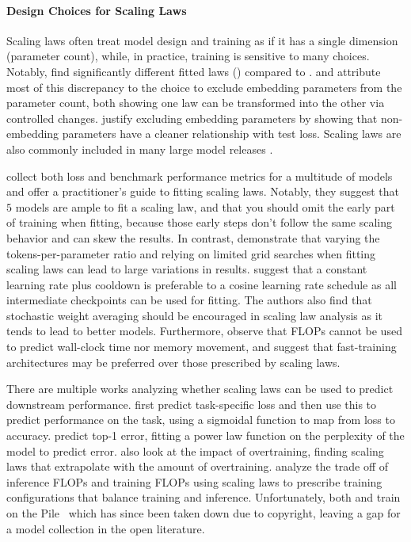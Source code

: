 \documentclass{article}
\begin{document}
\paragraph{Design Choices for Scaling Laws}
Scaling laws often treat model design and training as if it has a single dimension (parameter count), while, in practice, training is sensitive to many choices. 
Notably, \citet{hoffmann2022empirical} find significantly different 
fitted laws () compared to \citet{kaplan2020scaling}.
\citet{pearce2024reconciling} and \citet{porian2024resolving} attribute most of this discrepancy to the choice to exclude embedding parameters from the parameter count, both showing one law can be transformed into the other via controlled changes.
\citet{kaplan2020scaling} justify excluding embedding parameters by showing that non-embedding parameters have a cleaner relationship with test loss. %
Scaling laws are also commonly included in many large model releases \citep{hu2024minicpm, bi2024deepseek, dubey2024llama}.

\citet{choshen2024hitchhiker} collect both loss and benchmark performance metrics for a multitude of models and offer a practitioner's guide to fitting scaling laws.
Notably, they suggest that \(5\) models are ample to fit a scaling law, and that you should omit the early part of training when fitting, because those early steps don’t follow the same scaling behavior and can skew the results.
In contrast, \citet{misfitting} demonstrate that varying the tokens-per-parameter ratio and relying on limited grid searches when fitting scaling laws can lead to large variations in results.
\citet{hagele2024scaling} suggest that a constant learning rate plus cooldown is preferable to a cosine learning rate schedule as all intermediate checkpoints can be used for fitting.
The authors also find that stochastic weight averaging should be encouraged in scaling law analysis as it tends to lead to better models.
Furthermore, \citet{memmoves} observe that FLOPs cannot be used to predict wall-clock time nor memory movement, and suggest that fast-training architectures may be preferred over those prescribed by scaling laws.


There are multiple works analyzing whether scaling laws can be used to predict downstream performance.
\citet{bhagia2024establishing} first predict task-specific loss and then use this to predict performance on the task, using a sigmoidal function to map from loss to accuracy.
\citet{gadre2024language} predict top-1 error, fitting a power law function on the perplexity of the model to predict error.
\citet{gadre2024language} also look at the impact of overtraining, finding scaling laws that extrapolate with the amount of overtraining.
\citet{dey2023cerebras} analyze the trade off of inference FLOPs and training FLOPs using scaling laws to prescribe training configurations that balance training and inference.
Unfortunately, both \citet{dey2023cerebras} and \citet{biderman2023pythia} train on the Pile~\citep{gao2020pile800gbdatasetdiverse} which has since been taken down due to copyright, leaving a gap for a model collection in the open literature.
\end{document}

